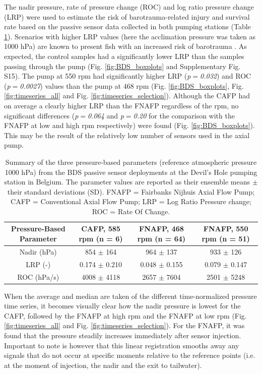 \documentclass[fleqn,10pt]{wlscirep}
\begin{document}
The nadir pressure, rate of pressure change (ROC) and log ratio pressure change (LRP) were used to estimate the risk of barotrauma-related injury and survival rate based on the passive sensor data collected in both pumping stations (Table \ref{tab:sensor}). Scenarios with higher LRP values (here the acclimation pressure was taken as 1000 hPa) are known to present fish with an increased risk of barotrauma \cite{Brown2014UnderstandingResources}. As expected, the control samples had a significantly lower LRP than the samples passing through the pump (Fig. \ref{fig:BDS_boxplots} and Supplementary Fig. S15). The pump at 550 rpm had significantly higher LRP (\textit{p$=$0.032}) and ROC (\textit{p$=$0.0027}) values than the pump at 468 rpm (Fig. \ref{fig:BDS_boxplots}, Fig. \ref{fig:timeseries_all} and Fig. \ref{fig:timeseries_selection}). Although the CAFP had on average a clearly higher LRP than the FNAFP regardless of the rpm, no significant differences (\textit{p$=$0.064} and \textit{p$=$0.20} for the comparison with the FNAFP at low and high rpm respectively) were found (Fig. \ref{fig:BDS_boxplots}). This may be the result of the relatively low number of sensors used in the axial pump. 

\begin{table}[]
\centering
\caption{Summary of the three pressure-based parameters (reference atmospheric pressure 1000 hPa) from the BDS passive sensor deployments at the Devil's Hole pumping station in Belgium. The parameter values are reported as their ensemble means $\pm$ their standard deviations (SD). FNAFP = Fairbanks Nijhuis Axial Flow Pump; CAFP = Conventional Axial Flow Pump; LRP = Log Ratio Pressure change; ROC = Rate Of Change.}
\begin{tabular}{cccc}
\toprule
Pressure-Based Parameter & CAFP, 585 rpm (n = 6) & FNAFP, 468 rpm (n = 64) & FNAFP, 550 rpm (n = 51)\\
\midrule
Nadir (hPa)   & 854 $\pm$ 164 & 964 $\pm$ 137 & 933 $\pm$ 126 \\
LRP (-)  & 0.174 $\pm$ 0.210 & 0.048 $\pm$ 0.155 & 0.079 $\pm$ 0.147 \\
ROC (hPa/s)& 4008 $\pm$ 4118 & 2657 $\pm$ 7604 & 2501 $\pm$ 5248 \\ 
\bottomrule
\end{tabular}
\label{tab:sensor}
\end{table}

When the average and median are taken of the different time-normalized pressure time series, it becomes visually clear how the nadir pressure is lowest for the CAFP, followed by the FNAFP at high rpm and the FNAFP at low rpm (Fig. \ref{fig:timeseries_all} and Fig. \ref{fig:timeseries_selection}). For the FNAFP, it was found that the pressure steadily increases immediately after sensor injection. Important to note is however that this linear registration smooths away any signals that do not occur at specific moments relative to the reference points (i.e. at the moment of injection, the nadir and the exit to tailwater).  
\end{document}
